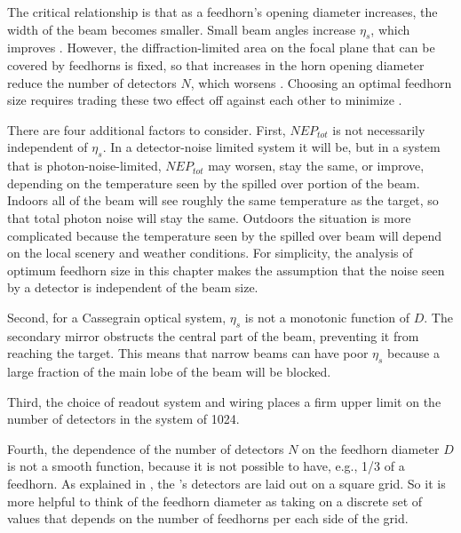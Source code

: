 The critical relationship is that as a feedhorn's opening diameter increases, the width of the beam becomes smaller.
Small beam angles increase $\eta_s$, which improves \NETD.
However, the diffraction-limited area on the focal plane that can be covered by feedhorns is fixed, so that increases in the horn opening diameter reduce the number of detectors $N$, which worsens \NETD.
Choosing an optimal feedhorn size requires trading these two effect off against each other to minimize \NETD.

There are four additional factors to consider.
First, $NEP_{tot}$ is not necessarily independent of $\eta_s$.
In a detector-noise limited system it will be, but in a system that is photon-noise-limited, $NEP_{tot}$ may worsen, stay the same, or improve, depending on the temperature seen by the spilled over portion of the beam.
Indoors all of the beam will see roughly the same temperature as the target, so that total photon noise will stay the same.
Outdoors the situation is more complicated because the temperature seen by the spilled over beam will depend on the local scenery and weather conditions.
For simplicity, the analysis of optimum feedhorn size in this chapter makes the assumption that the noise seen by a detector is independent of the beam size.

Second, for a Cassegrain optical system, $\eta_s$ is not a monotonic function of $D$.
The secondary mirror obstructs the central part of the beam, preventing it from reaching the target.
This means that narrow beams can have poor $\eta_s$ because a large fraction of the main lobe of the beam will be blocked.

Third, the choice of readout system and wiring places a firm upper limit on the number of detectors in the system of 1024.

Fourth, the dependence of the number of detectors $N$ on the feedhorn diameter $D$ is not a smooth function, because it is not possible to have, e.g., 1/3 of a feedhorn.
As explained in , the \Imager's detectors are laid out on a square grid.
So it is more helpful to think of the feedhorn diameter as taking on a discrete set of values that depends on the number of feedhorns per each side of the grid.

